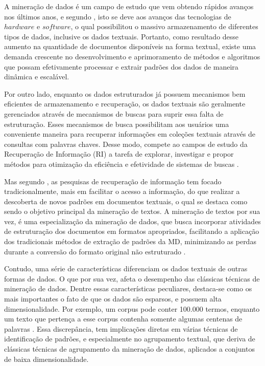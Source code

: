 A mineração de dados é um campo de estudo que vem obtendo rápidos avanços nos últimos anos, e
segundo , isto se deve aos avanços das tecnologias de $hardware$ e
$software$, o qual possibilitou o massivo armazenamento de diferentes tipos de dados, inclusive os
dados textuais. Portanto, como resultado desse aumento na quantidade de documentos disponíveis na
forma textual, existe uma demanda crescente no desenvolvimento e aprimoramento de métodos e
algoritmos que possam efetivamente processar e extrair padrões dos dados de maneira dinâmica e
escalável. 

Por outro lado, enquanto os dados estruturados já possuem mecanismos bem eficientes de armazenamento
e recuperação, os dados textuais são geralmente gerenciados através de mecanismos de buscas para
suprir essa falta de estruturação. Esses mecanismos de busca possibilitam aos usuários uma
conveniente maneira para recuperar informações em coleções textuais através de consultas com palavras
chaves. Desse modo, compete ao campos de estudo da Recuperação de Informação (RI) a tarefa de
explorar, investigar e propor métodos para otimização da eficiência e efetividade de
sistemas de buscas \cite{Baeza2011}. 

Mas segundo , as pesquisas de recuperação de informação tem focado
tradicionalmente, mais em facilitar o acesso a informação, do que realizar a descoberta de novos
padrões em documentos textuais, o qual se destaca como sendo o objetivo principal da mineração de
textos. A mineração de textos por sua vez, é uma especialização da mineração de dados, que busca
incorporar atividades de estruturação dos documentos em formatos apropriados, facilitando a
aplicação dos tradicionais métodos de extração de padrões da MD, minimizando as perdas durante a
conversão do formato original não estruturado \cite{Nogueira2013}.

Contudo, uma série de características diferenciam os dados textuais de outras formas de dados. O que
por sua vez, afeta o desempenho das clássicas técnicas de mineração de dados.  Dentre essas
características peculiares, destaca-se como os mais importantes o fato de que os dados são esparsos,
e possuem alta dimensionalidade. Por exemplo, um corpus pode conter 100.000 termos, enquanto um
texto que pertença a esse corpus contenha somente algumas centenas de palavras \cite{Aggarwal2012}.
Essa discrepância, tem implicações diretas em várias técnicas de identificação de padrões, e
especialmente no agrupamento textual, que deriva de clássicas técnicas de agrupamento da mineração
de dados, aplicados a conjuntos de baixa dimensionalidade. 


